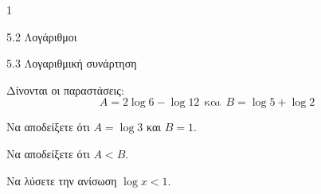 \begin{ylh}{1}
\item 5.2 Λογάριθμοι
\item 5.3 Λογαριθμική συνάρτηση
\end{ylh}
Δίνονται οι παραστάσεις:
\begin{equation*}Α = 2\log 6 - \log 12\ \ \text{και}\ \ Β = \log 5 + \log 2\end{equation*}
\begin{alist}
\item Να αποδείξετε ότι $Α = \log 3$ και $Β = 1$.
\item Να αποδείξετε ότι $Α < Β$.
\item Να λύσετε την ανίσωση $\log x < 1$.
\end{alist}

